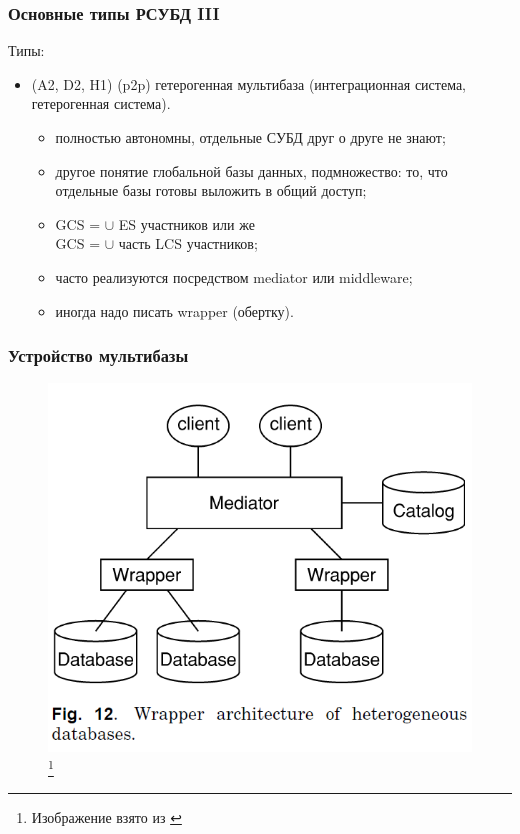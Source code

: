 \documentclass{beamer}
\begin{document}
\begin{frame}
\frametitle{Основные типы РСУБД III}

Типы:
  \begin{itemize}
    \item (A2, D2, H1) (p2p) гетерогенная мультибаза (интеграционная система, гетерогенная система).
    \begin{itemize}
    \setlength\itemsep{1em}      
      \item полностью автономны, отдельные СУБД друг о друге не знают;
      \item другое понятие глобальной базы данных, подмножество: то, что отдельные базы готовы выложить в общий доступ;
      \item GCS = $\cup$ ES участников или же \\GCS = $\cup$ часть LCS участников;
      \item часто реализуются посредством mediator или middleware;
      \item иногда надо писать wrapper (обертку).
  \end{itemize}
\end{itemize}
\end{frame}

\begin{frame}
\frametitle{Устройство мультибазы}

\begin{figure}[htb]
\includegraphics[width=\textwidth,height=0.75\textheight,keepaspectratio]{kossman-1.png} 
\footnote{\tiny{Изображение взято из \cite{Kossmann2000}}}
\end{figure}

\end{frame}
\end{document}

